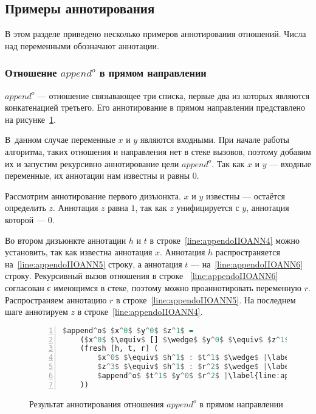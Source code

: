 \subsection{Примеры аннотирования}

В этом разделе приведено несколько примеров аннотирования отношений.
Числа над переменными обозначают аннотации.


\subsubsection{Отношение $append^o$ в прямом направлении}

$append^o$ --- отношение связывающее три списка, первые два из которых являются конкатенацией третьего.
Его аннотирование в прямом направлении представлено на рисунке~\ref{lst:appendoIIOANN}.

В~данном случае  переменные $x$ и $y$ являются входными. 
При начале работы алгоритма, таких отношения и направления нет в стеке вызовов, поэтому добавим их и запустим рекурсивно аннотирование цели $append^o$.
Так как $x$ и $y$ --- входные переменные, их аннотации нам известны и равны $0$.

Рассмотрим аннотирование первого дизъюнкта.
$x$ и $y$ известны --- остаётся определить $z$.
Аннотация $z$ равна $1$, так как $z$ унифицируется с $y$, аннотация которой --- $0$.

Во втором дизъюнкте аннотации $h$ и $t$ в строке~\ref{line:appendoIIOANN4} можно установить, так как известна аннотация $x$.
Аннотация $h$ распространяется на~\ref{line:appendoIIOANN5} строку, а аннотация $t$ --- на~\ref{line:appendoIIOANN6} строку.
Рекурсивный вызов отношения в строке ~\ref{line:appendoIIOANN6} согласован с имеющимся в стеке, поэтому можно проаннотировать переменную $r$.
Распространяем аннотацию $r$ в строке~\ref{line:appendoIIOANN5}.
На последнем шаге аннотируем $z$ в строке~\ref{line:appendoIIOANN4}.

\begin{figure}[h!]
  \begin{center}
  \begin{minipage}{0.4\textwidth}
  \begin{lstlisting}[language=Haskell, frame=single, numbers=left,numberstyle=\small, firstnumber=1, escapechar=|]
  $append^o$ $x^0$ $y^0$ $z^1$ =
    ($x^0$ $\equiv$ [] $\wedge$ $y^0$ $\equiv$ $z^1$) $\vee$ |\label{line:appendoIIOANN2}|
    (fresh [h, t, r] (
        $x^0$ $\equiv$ $h^1$ : $t^1$ $\wedge$ |\label{line:appendoIIOANN4}|
        $z^3$ $\equiv$ $h^1$ : $r^2$ $\wedge$ |\label{line:appendoIIOANN5}|
        $append^o$ $t^1$ $y^0$ $r^2$ |\label{line:appendoIIOANN6}|
    ))
    \end{lstlisting}
  \end{minipage}
  \end{center}
  \caption{Результат аннотирования отношения $append^o$ в прямом направлении}
  \label{lst:appendoIIOANN}
\end{figure}

